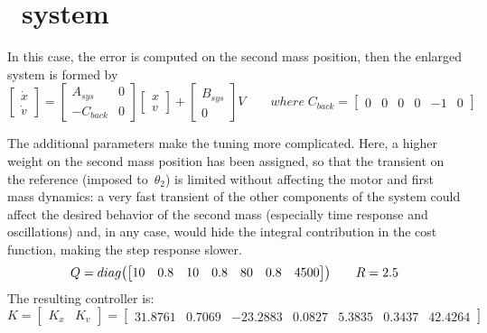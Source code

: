 \section{\twodof\ system}

In this case, the error is computed on the second mass position, then the enlarged system is formed by
\begin{equation}
	\begin{bmatrix}
		\dot{x} \\
		\dot{v}
	\end{bmatrix}
	=
	\begin{bmatrix}
		A_{sys} & 0 \\
		-C_{back} & 0
	\end{bmatrix}
	\begin{bmatrix}
		x \\
		v
	\end{bmatrix}
	+
	\begin{bmatrix}
		B_{sys} \\
		0
	\end{bmatrix}
	V
	\qquad
	where \; C_{back} =
	\begin{bmatrix}
		0 & 0 & 0 & 0 & -1 & 0
	\end{bmatrix}
\end{equation}

The additional parameters make the tuning more complicated. Here, a higher weight on the second mass position has been assigned, so that the transient on the reference (imposed to~$\theta_2$) is limited without affecting the motor and first mass dynamics: a very fast transient of the other components of the system could affect the desired behavior of the second mass (especially time response and oscillations) and, in any case, would hide the integral contribution in the cost function, making the step response slower.
\[
	Q = diag
	\bigl{(}
	\begin{bmatrix}
		10 & 0.8 & 10 & 0.8 & 80 & 0.8 & 4500
	\end{bmatrix}
	\bigr{)}
	\qquad
	R = 2.5
\]
The resulting controller is:
\begin{equation}
	K =
	\left[
	\begin{array}{c|c}
		K_x & K_v
	\end{array}
	\right]
	=
	\left[
	\begin{array}{cccccc|c}
		31.8761 & 0.7069 & -23.2883 & 0.0827 & 5.3835 & 0.3437 & 42.4264
	\end{array}
	\right]
	\label{eq:2dof_LQ_fastK}
\end{equation}

